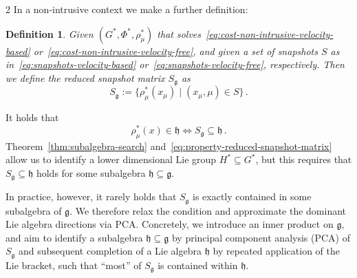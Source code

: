 \documentclass{article}
\newtheorem{theorem}{Theorem}[section]
\newtheorem{definition}[theorem]{Definition}
\newtheorem{corollary}{Corollary}[theorem]
\newcommand{\g}{\mathfrak{g}}                               %
\newcommand{\state}{x}
\begin{document}
\begin{multicols}{2}
In a non-intrusive context we make a further definition: 
\begin{definition}\label{def:reduced-snapshot-matrix}
    Given $(G^*,\Phi^*,\rho^*_\mu)$ that solves~\eqref{eq:cost-non-intrusive-velocity-based} or~\eqref{eq:cost-non-intrusive-velocity-free}, and given a set of snapshots $S$ as in~\eqref{eq:snapshots-velocity-based} or~\eqref{eq:snapshots-velocity-free}, respectively. Then we define the reduced snapshot matrix $S_\g$ as
    \begin{equation}\label{eq:reduced-snapshot-matrix}
        S_\g := \{\rho^*_\mu(\state_\mu) \;|\; (\state_\mu,\mu) \in S\}\,.
    \end{equation}
\end{definition} 
It holds that %
\begin{equation}\label{eq:property-reduced-snapshot-matrix}
    \rho_{\mu}^*(\state) \in \mathfrak{h} \Leftrightarrow S_\g \subseteq \mathfrak{h}\,.
\end{equation}
Theorem~\ref{thm:subalgebra-search} and~\eqref{eq:property-reduced-snapshot-matrix} allow us to identify a lower dimensional Lie group $H^* \subseteq G^*$, but this requires that $S_\g \subseteq \mathfrak{h}$ holds for some subalgebra $\mathfrak{h} \subseteq \g$.

In practice, however, it rarely holds that $S_\g$ is exactly contained in some subalgebra of $\g$. We therefore relax the condition and approximate the dominant Lie algebra directions via PCA. Concretely, we introduce an inner product on $\g$, and aim to identify a subalgebra $\mathfrak{h}\subseteq \g$ by principal component analysis (PCA) of $S_\g$ and subsequent completion of a Lie algebra $\mathfrak{h}$ by repeated application of the Lie bracket, such that ``most'' of $S_\g$ is contained within $\mathfrak{h}$. %


\end{multicols}
\end{document}
